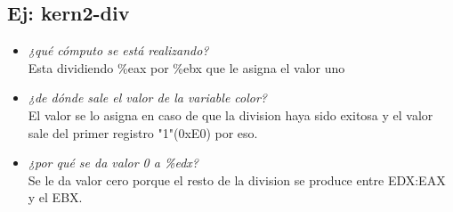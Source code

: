 \documentclass[a4paper, 12pt]{article}
\begin{document}
		\subsection{Ej: kern2-div}
		\begin{itemize}
			Explicar el funcionamiento exacto de la línea asm(\ldots):\\
\begin{lstlisting}
	void kmain(const multiboot_info_t *mbi) {
	int8_t linea;
	uint8_t color;

	// ...

	idt_init();
	irq_init();

	asm("div %4"
	: "=a"(linea), "=c"(color)
	: "0"(18), "1"(0xE0), "b"(1), "d"(0));

	vga_write2("Funciona vga_write2?", linea, color);
	}

\end{lstlisting}
			\item \textit{¿qué cómputo se está realizando?\\}
			Esta dividiendo \%eax por \%ebx que le asigna el valor uno\\
			\item \textit{¿de dónde sale el valor de la variable color?\\}
			El valor se lo asigna en caso de que la division haya sido exitosa
			y el valor sale del primer registro "1"(0xE0) por eso.\\
			\item \textit{¿por qué se da valor 0 a \%edx?\\}
			Se le da valor cero porque el resto de la division se produce entre
			EDX:EAX y el EBX.\\
		\end{itemize}
\end{document}
